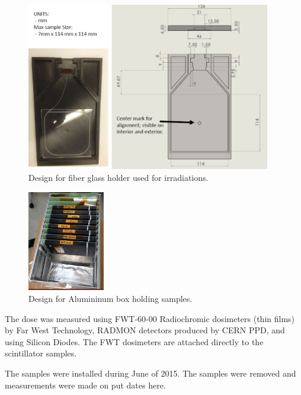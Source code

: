 \documentclass[review]{elsarticle}
\begin{document}
\begin{figure}[!ht]
\begin{center}
  \includegraphics[width=0.95\textwidth]{./figures/samplemount.pdf}
\caption{Design for fiber glass holder used for irradiations.
}
\label{fig:sampleholder}
\end{center}
\end{figure}


\begin{figure}[!ht]
\begin{center}
  \includegraphics[width=0.3\textwidth]{./figures/hanging.pdf}
\caption{Design for Alumininum box holding samples.
}
\label{fig:hangbox}
\end{center}
\end{figure}


The dose was measured using FWT-60-00 Radiochromic dosimeters (thin films) by Far West Technology, RADMON detectors produced by CERN PPD,  and using Silicon Diodes.  The FWT dosimeters are attached directly to the scintillator samples.


The samples were installed during June of 2015.  The samples were removed
and measurements were made on {\color{red} put dates here}.
\end{document}
